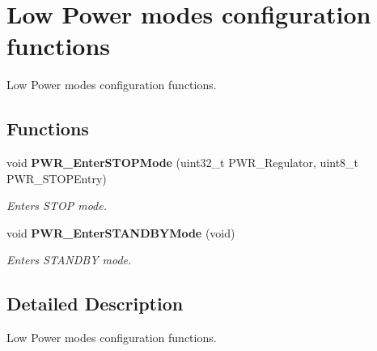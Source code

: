 \section{Low Power modes configuration functions}
\label{group__PWR__Group6}


Low Power modes configuration functions.  


\subsection*{Functions}
\begin{DoxyCompactItemize}
\item 
void \textbf{ P\+W\+R\+\_\+\+Enter\+S\+T\+O\+P\+Mode} (uint32\+\_\+t P\+W\+R\+\_\+\+Regulator, uint8\+\_\+t P\+W\+R\+\_\+\+S\+T\+O\+P\+Entry)
\begin{DoxyCompactList}\small\item\em Enters S\+T\+OP mode. \end{DoxyCompactList}\item 
void \textbf{ P\+W\+R\+\_\+\+Enter\+S\+T\+A\+N\+D\+B\+Y\+Mode} (void)
\begin{DoxyCompactList}\small\item\em Enters S\+T\+A\+N\+D\+BY mode. \end{DoxyCompactList}\end{DoxyCompactItemize}


\subsection{Detailed Description}
Low Power modes configuration functions. 


